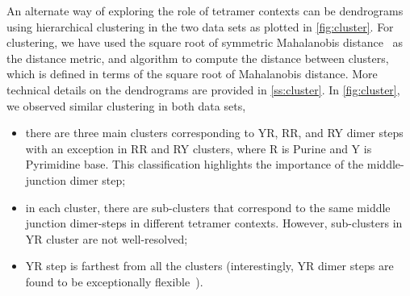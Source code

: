 An alternate way of exploring the role of tetramer contexts can be dendrograms using hierarchical clustering in the two data sets as plotted in \cref{fig:cluster}.
For clustering, we have used the square root of symmetric Mahalanobis distance~\cite{mahal} as the distance metric, and  algorithm to compute the distance between clusters, which is defined in terms of the square root of Mahalanobis distance. More technical details on the dendrograms are provided in \cref{ss:cluster}.
In \cref{fig:cluster}, we observed similar clustering in both data sets, 
\begin{itemize}
\item there are three main clusters corresponding to YR, RR, and RY dimer steps with an exception in RR and RY clusters, where R is Purine and Y is Pyrimidine base. This classification highlights the importance of the middle-junction dimer step;
\item in each cluster, there are sub-clusters that correspond to the same middle junction dimer-steps in different
tetramer contexts. However, sub-clusters in YR cluster are not well-resolved; 
\item YR step is farthest from all the clusters (interestingly, YR dimer steps are found to be exceptionally flexible~\cite{xraydata}).
\end{itemize}

